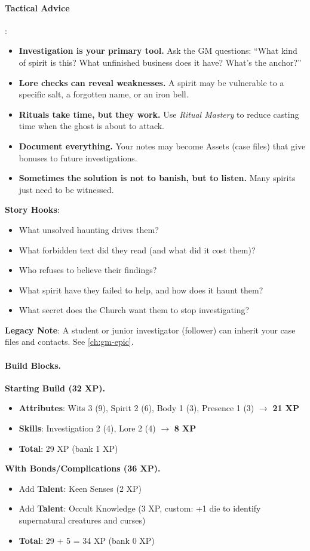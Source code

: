 \paragraph{Tactical Advice}:
\begin{itemize}
\item \textbf{Investigation is your primary tool.} Ask the GM questions: ``What kind of spirit is this? What unfinished business does it have? What's the anchor?''
\item \textbf{Lore checks can reveal weaknesses.} A spirit may be vulnerable to a specific salt, a forgotten name, or an iron bell.
\item \textbf{Rituals take time, but they work.} Use \emph{Ritual Mastery} to reduce casting time when the ghost is about to attack.
\item \textbf{Document everything.} Your notes may become Assets (case files) that give bonuses to future investigations.
\item \textbf{Sometimes the solution is not to banish, but to listen.} Many spirits just need to be witnessed.
\end{itemize}

\textbf{Story Hooks}:
\begin{itemize}
\item What unsolved haunting drives them?
\item What forbidden text did they read (and what did it cost them)?
\item Who refuses to believe their findings?
\item What spirit have they failed to help, and how does it haunt them?
\item What secret does the Church want them to stop investigating?
\end{itemize}

\textbf{Legacy Note}: A student or junior investigator (follower) can inherit your case files and contacts. See \ref{ch:gm-epic}.

\paragraph{Build Blocks.}
\textbf{Starting Build (32 XP).}
\begin{itemize}
\item \textbf{Attributes}: Wits 3 (9), Spirit 2 (6), Body 1 (3), Presence 1 (3) \(\rightarrow\) \textbf{21 XP}
\item \textbf{Skills}: Investigation 2 (4), Lore 2 (4) \(\rightarrow\) \textbf{8 XP}
\item \textbf{Total}: 29 XP (bank 1 XP)
\end{itemize}
\textbf{With Bonds/Complications (36 XP).}
\begin{itemize}
\item Add \textbf{Talent}: Keen Senses (2 XP)
\item Add \textbf{Talent}: Occult Knowledge (3 XP, custom: +1 die to identify supernatural creatures and curses)
\item \textbf{Total}: 29 + 5 = 34 XP (bank 0 XP)
\end{itemize}

